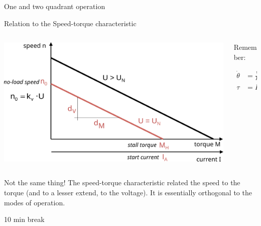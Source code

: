 \documentclass[compress]{beamer}
\makeatletter
\let\beamer@writeslidentry@miniframeson=\beamer@writeslidentry
\def\beamer@writeslidentry@miniframesoff{%
  \expandafter\beamer@ifempty\expandafter{\beamer@framestartpage}{}%
  {%
    \clearpage\beamer@notesactions%
  }
}
\newcommand*{\miniframeson}{\let\beamer@writeslidentry=\beamer@writeslidentry@miniframeson}
\newcommand*{\miniframesoff}{\let\beamer@writeslidentry=\beamer@writeslidentry@miniframesoff}
\makeatother
\begin{document}
{
    \begin{frame}{One and two quadrant operation}
    \end{frame}
}


\begin{frame}{Relation to the Speed-torque characteristic}

    \begin{columns}
        \begin{column}{0.7\linewidth}
    \begin{center}
        \includegraphics[width=\linewidth]{../part3/figs/voltage-torque}
    \end{center}


        \end{column}
        \begin{column}{0.3\linewidth}
            Remember:

    \begin{align*}
        \dot\theta &= \frac{V}{K} - R \cdot \frac{\tau}{K^2} \\
        \tau &= K \cdot I
    \end{align*}

        \end{column}
    \end{columns}

    \begin{center}
        Not the same thing! The speed-torque characteristic related the speed to
        the torque (and to a lesser extend, to the voltage). It is essentially orthogonal to
        the modes of operation.
    \end{center}

\end{frame}


\miniframesoff
\begin{frame}[plain]
    \begin{center}
        \Large
        10 min break\\[2em]
    \end{center}
\end{frame}
\miniframeson
\end{document}
